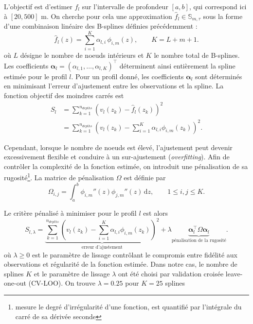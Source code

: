 \documentclass[11pt,a4paper,oneside]{report}
\begin{document}
	L'objectif est d'estimer $f_l$ sur l'intervalle de profondeur $[a,b]$, qui correspond ici à $[20,500]$ m. On cherche pour cela une approximation $\hat f_l \in \mathbb{S}_{m,\tau}$ sous la forme d'une combinaison linéaire des B-splines définies précédemment :
	\begin{equation}
		\hat f_l(z)
		=
		\sum_{i=1}^{K}
		\alpha_{l,i}\,\phi_{i,m}(z),
		\qquad K=L+m+1.
	\end{equation}
	où $L$ désigne le nombre de noeuds intérieurs et $K$ le nombre total de B-splines. Les coefficients $\boldsymbol{\alpha}_l = (\alpha_{l,1},\ldots,\alpha_{l,K})^\top$ déterminent ainsi entièrement la spline estimée pour le profil $l$. Pour un profil donné, les coefficients $\boldsymbol{\alpha}_l$ sont déterminés en minimisant l'erreur d'ajustement entre les observations et la spline. La fonction objectif des moindres carrés est
	\begin{align}
		S_l
		&=
		\sum_{k=1}^{n_{depths}}
		\left(
		v_l(z_k)-\hat f_l(z_k)
		\right)^2
		\\
		&=
		\sum_{k=1}^{n_{depths}}
		\left(
		v_l(z_k)
		-
		\sum_{i=1}^{K}
		\alpha_{l,i}\phi_{i,m}(z_k)
		\right)^2.
	\end{align}
	
	Cependant, lorsque le nombre de noeuds est élevé, l'ajustement peut devenir excessivement flexible et conduire à un sur-ajustement (\textit{overfitting}). Afin de contrôler la complexité de la fonction estimée, on introduit une pénalisation de sa rugosité\footnote{mesure le degré d'irrégularité d'une fonction, est quantifié par l'intégrale du carré de sa dérivée seconde}. La matrice de pénalisation $\Omega$ est définie par
	\begin{equation}
		\Omega_{i,j}
		=
		\int_a^b
		\phi_{i,m}''(z)\phi_{j,m}''(z)\,\mathrm{d}z,
		\qquad
		1\leq i,j\leq K.
	\end{equation}
	
	Le critère pénalisé à minimiser pour le profil $l$ est alors
	\begin{equation}
		S_{l,\lambda}
		=
		\underbrace{
			\sum_{k=1}^{n_{depths}}
			\left(
			v_l(z_k)
			-
			\sum_{i=1}^{K}
			\alpha_{l,i}\phi_{i,m}(z_k)
			\right)^2
		}_{\text{erreur d'ajustement}}
		+
		\lambda
		\underbrace{
			\boldsymbol{\alpha}_l^\top
			\Omega
			\boldsymbol{\alpha}_l
		}_{\text{pénalisation de la rugosité}}.
	\end{equation}
	où $\lambda\geq0$ est le paramètre de lissage contrôlant le compromis entre fidélité aux observations et régularité de la fonction estimée.
	Dans notre cas, le nombre de splines $K$ et le paramètre de lissage $\lambda$ ont été choisi par validation croisée leave-one-out (CV-LOO). On trouve $\lambda = 0.25$ pour $K = 25$ splines
	
\end{document}
